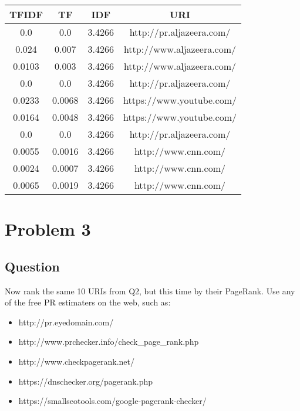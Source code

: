 \documentclass[letterpaper,12pt]{article}
\begin{document}
\vspace{5mm}
\begin{center}
 \begin{tabular}{||c c c c||} 
 \hline
 TFIDF & TF & IDF & URI \\ [0.5ex] 
 \hline\hline
 0.0 & 0.0 & 3.4266 & http://pr.aljazeera.com/ \\ 
 \hline
 0.024 & 0.007 & 3.4266 & http://www.aljazeera.com/ \\
 \hline
  0.0103 & 0.003 & 3.4266 & http://www.aljazeera.com/ \\
 \hline
  0.0 & 0.0 & 3.4266 & http://pr.aljazeera.com/ \\
 \hline
  0.0233 & 0.0068 & 3.4266 & https://www.youtube.com/ \\
 \hline
  0.0164 & 0.0048 & 3.4266 & https://www.youtube.com/ \\
 \hline
  0.0 & 0.0 & 3.4266 & http://pr.aljazeera.com/ \\
 \hline
 0.0055 & 0.0016 & 3.4266 & http://www.cnn.com/ \\
 \hline
 0.0024 & 0.0007 & 3.4266 & http://www.cnn.com/ \\
 \hline
   0.0065 & 0.0019 & 3.4266 & http://www.cnn.com/ \\
 \hline
\end{tabular}
\end{center}
\vspace{2mm}
\vspace*{5pt}

\section{Problem 3}

\subsection{Question}
\vspace*{10pt}
Now rank the same 10 URIs from Q2, but this time by their PageRank. Use any of the free PR estimaters on the web, such as:

\begin{itemize}
  \item http://pr.eyedomain.com/
  \item http://www.prchecker.info/check_page_rank.php
  \item http://www.checkpagerank.net/
  \item https://dnschecker.org/pagerank.php
  \item https://smallseotools.com/google-pagerank-checker/
\end{itemize}
\end{document}
